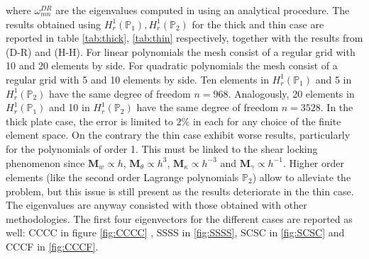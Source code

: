 \documentclass[preprint,12pt]{elsarticle}
\begin{document}
{where $\omega_{mn}^{DR}$ are the eigenvalues computed in \cite{dawe1980rayleigh} using an analytical procedure. The results obtained using $H_r^1(\mathbb{P}_1), H_r^1(\mathbb{P}_2)$ for the thick and thin case are reported in table \ref{tab:thick}, \ref{tab:thin} respectively, together with the results from \cite{dawe1980rayleigh} (D-R) and \cite{huang1984nine} (H-H). For linear polynomials the mesh consist of a regular grid with 10 and 20 elements by side. For quadratic polynomials the mesh consist of a regular grid with 5 and 10 elements by side. Ten elements in $H_r^1(\mathbb{P}_1)$ and 5 in $H_r^1(\mathbb{P}_2)$ have the same degree of freedom $n=968$. Analogously, 20 elements in $H_r^1(\mathbb{P}_1)$ and 10 in $H_r^1(\mathbb{P}_2)$ have the same degree of freedom $n=3528$.  In the thick plate case,  the error is limited to $2\%$ in each for any choice of the finite element space.  On the contrary the thin case exhibit worse results, particularly for the polynomials of order 1. This must be linked to the shear locking phenomenon since $\bm{M}_{w} \propto h$, $\bm{M}_{\theta} \propto h^3$, $\bm{M}_{\kappa} \propto h^{-3}$ and $\bm{M}_{\gamma} \propto h^{-1}$. Higher order elements (like the second order Lagrange polynomials $\mathbb{P}_2$) allow to alleviate the problem, but this issue is still present as the results deteriorate in the thin case. The eigenvalues are anyway consisted with those obtained with other methodologies. The first four eigenvectors for the different cases are reported as well: CCCC in figure \ref{fig:CCCC} , SSSS in \ref{fig:SSSS}, SCSC in \ref{fig:SCSC} and CCCF in \ref{fig:CCCF}.
}
\end{document}
